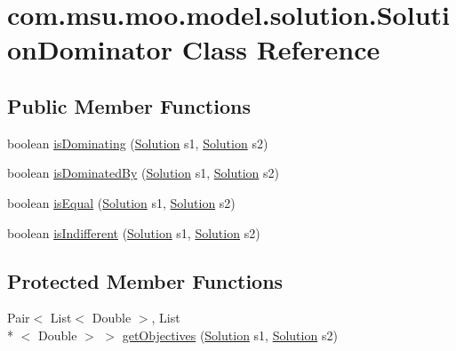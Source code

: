 \hypertarget{classcom_1_1msu_1_1moo_1_1model_1_1solution_1_1SolutionDominator}{\section{com.\-msu.\-moo.\-model.\-solution.\-Solution\-Dominator Class Reference}
\label{classcom_1_1msu_1_1moo_1_1model_1_1solution_1_1SolutionDominator}
}
\subsection*{Public Member Functions}
\begin{DoxyCompactItemize}
\item 
boolean \hyperlink{classcom_1_1msu_1_1moo_1_1model_1_1solution_1_1SolutionDominator_acd28c6c22e3049f8a92faf5011921603}{is\-Dominating} (\hyperlink{classcom_1_1msu_1_1moo_1_1model_1_1solution_1_1Solution}{Solution} s1, \hyperlink{classcom_1_1msu_1_1moo_1_1model_1_1solution_1_1Solution}{Solution} s2)
\item 
boolean \hyperlink{classcom_1_1msu_1_1moo_1_1model_1_1solution_1_1SolutionDominator_ad946cb0ebc46915b52be8437ed3cf0cb}{is\-Dominated\-By} (\hyperlink{classcom_1_1msu_1_1moo_1_1model_1_1solution_1_1Solution}{Solution} s1, \hyperlink{classcom_1_1msu_1_1moo_1_1model_1_1solution_1_1Solution}{Solution} s2)
\item 
boolean \hyperlink{classcom_1_1msu_1_1moo_1_1model_1_1solution_1_1SolutionDominator_a89704420da7d4b13392e11dfc6fa25f7}{is\-Equal} (\hyperlink{classcom_1_1msu_1_1moo_1_1model_1_1solution_1_1Solution}{Solution} s1, \hyperlink{classcom_1_1msu_1_1moo_1_1model_1_1solution_1_1Solution}{Solution} s2)
\item 
boolean \hyperlink{classcom_1_1msu_1_1moo_1_1model_1_1solution_1_1SolutionDominator_aec7ffa1eadc2b9f2c5102f33eed4be9c}{is\-Indifferent} (\hyperlink{classcom_1_1msu_1_1moo_1_1model_1_1solution_1_1Solution}{Solution} s1, \hyperlink{classcom_1_1msu_1_1moo_1_1model_1_1solution_1_1Solution}{Solution} s2)
\end{DoxyCompactItemize}
\subsection*{Protected Member Functions}
\begin{DoxyCompactItemize}
\item 
Pair$<$ List$<$ Double $>$, List\\*
$<$ Double $>$ $>$ \hyperlink{classcom_1_1msu_1_1moo_1_1model_1_1solution_1_1SolutionDominator_a99dc57e590efafd86490f85bb7d2beb9}{get\-Objectives} (\hyperlink{classcom_1_1msu_1_1moo_1_1model_1_1solution_1_1Solution}{Solution} s1, \hyperlink{classcom_1_1msu_1_1moo_1_1model_1_1solution_1_1Solution}{Solution} s2)
\end{DoxyCompactItemize}


